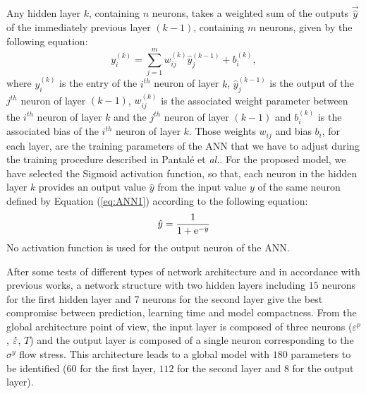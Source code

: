 \documentclass[twoside,english,1p,final,sort&compress]{elsarticle}
\makeatletter
\theoremstyle{plain}
\DeclareRobustCommand{\e}[1]{{\rm e}^{#1}}
\DeclareRobustCommand{\lay}[1]{^{(#1)}}
\DeclareRobustCommand{\mdot}[1]{\accentset{\mbox{\bfseries .}}{#1}}
\DeclareRobustCommand{\eal}{et \emph{al.}\@\xspace}
\makeatother
\begin{document}
Any hidden layer $k$, containing $n$ neurons, takes a weighted sum of the outputs $\overrightarrow{\hat{y}}$ of the immediately previous layer $(k-1)$, containing $m$ neurons, given by the following equation:
\begin{equation}
y_i\lay{k} = \sum_{j=1}^m w_{ij}\lay{k} \hat{y}_j^{(k-1)}+ b_i\lay{k},\label{eq:ANN1}
\end{equation}
where $y_i\lay{k}$ is the entry of the $i^{th}$ neuron of layer $k$, $\hat{y}_j\lay{k-1}$ is the output of the $j^{th}$ neuron of layer $(k-1)$, $w_{ij}\lay{k}$ is the associated weight parameter between the $i^{th}$ neuron of layer $k$ and the $j^{th}$ neuron of layer $(k-1)$ and $b_i\lay{k}$ is the associated bias of the $i^{th}$ neuron of layer $k$.
Those weights $w_{ij}$ and bias $b_i$, for each layer, are the training parameters of the ANN that we have to adjust during the training procedure described in Pantalé \eal \cite{Pantale-2021}.
For the proposed model, we have selected the Sigmoid activation function, so that, each neuron in the hidden layer $k$ provides an output value ${\hat{y}}$ from the input value $y$ of the same neuron defined by Equation (\ref{eq:ANN1}) according to the following equation:
\begin{equation}
\hat{y}=\frac{1}{1 + \e{-y}}\label{eq:ANN2}
\end{equation}
No activation function is used for the output neuron of the ANN.

After some tests of different types of network architecture and in accordance with previous works, a network structure with two hidden layers including $15$ neurons for the first hidden layer and 7 neurons for the second layer give the best compromise between prediction, learning time and model compactness.
From the global architecture point of view, the input layer is composed of three neurons ($\varepsilon^p$, $\mdot\varepsilon$, $T$) and the output layer is composed of a single neuron corresponding to the $\sigma^y$ flow stress.
This architecture leads to a global model with $180$ parameters to be identified ($60$ for the first layer, $112$ for the second layer and 8 for the output layer).
\end{document}
